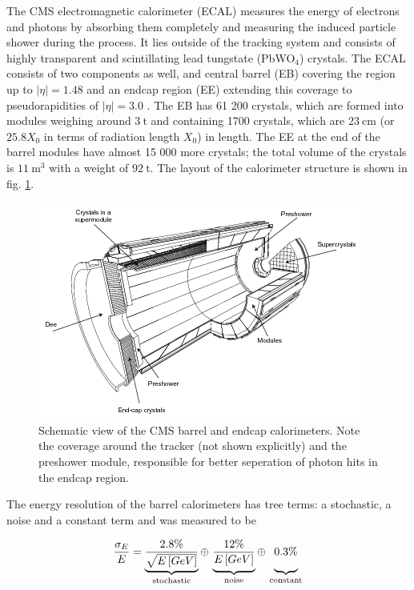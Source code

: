 
The CMS electromagnetic calorimeter (ECAL) measures the energy of electrons and photons by absorbing them completely and measuring the induced particle shower during the process. It lies outside of the tracking system and consists of highly transparent and scintillating lead tungstate (PbWO$_4$) crystals. The ECAL consists of two components as well, and central barrel (EB) covering the region up to $|\eta| = 1.48$ and an endcap region (EE) extending this coverage to pseudorapidities of $|\eta| = 3.0$ \cite{Biino_2015}. The EB has 61 200 crystals, which are formed into modules weighing around $\SI{3}{\tonne}$ and containing 1700 crystals, which are $\SI{23}{\centi\meter}$ (or $25.8 X_0$ in terms of radiation length $X_0$) in length. The EE at the end of the barrel modules have almost 15 000 more crystals; the total volume of the crystals is $\SI{11}{\cubic\meter}$ with a weight of $\SI{92}{\tonne}$. The layout of the calorimeter structure is shown in fig. \ref{fig:ecal}.

\begin{figure}[h!]
	\centering
	\includegraphics[width=0.6\linewidth]{figures/experiment/ecal.png}
	\caption{Schematic view of the CMS barrel and endcap calorimeters. Note the coverage around the tracker (not shown explicitly) and the preshower module, responsible for better seperation of photon hits in the endcap region. \cite{Chatrchyan:1554142}}
	\label{fig:ecal}
\end{figure}

The energy resolution of the barrel calorimeters has tree terms: a stochastic, a noise and a constant term and was measured to be \cite{Chatrchyan:1554142}

\begin{equation*}
	\frac{\sigma_E}{E} = \underbrace{\frac{2.8\%}{\sqrt{E\left[GeV\right]}}}_\text{stochastic} \oplus \, \underbrace{\vphantom{\frac{2.8\%}{\sqrt{E\left[GeV\right]}}}\frac{12\%}{E\left[GeV\right]}}_\text{noise} \oplus \, \underbrace{\vphantom{\frac{2.8\%}{\sqrt{E\left[GeV\right]}}}0.3\%}_\text{constant}
\end{equation*}

